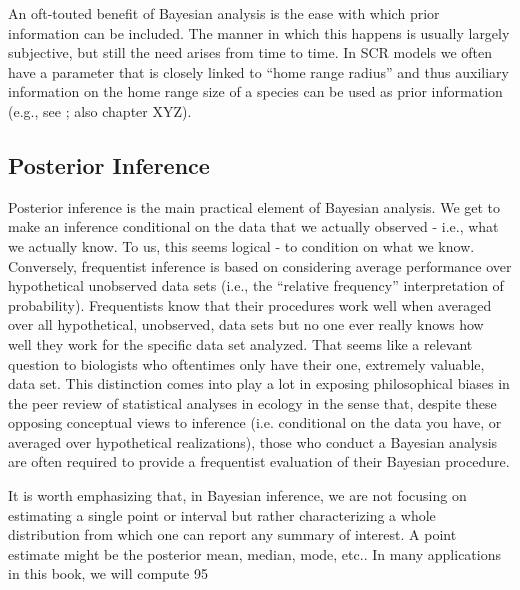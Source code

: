 An oft-touted benefit of Bayesian analysis is the ease with which
prior information can be included. The manner in which this happens is
usually largely subjective, but still the need arises from time to
time. In SCR models we often have a parameter that is closely linked
to ``home range radius'' and thus auxiliary information on the home
range size of a species can be used as prior information (e.g., see
\citet{chandler_royle:2012} ; also chapter XYZ). 



\subsection{Posterior Inference}

Posterior inference is the main practical element  of Bayesian analysis. We get to make an inference conditional on the data that we actually observed - i.e., what we actually know.  To us, this seems logical - to condition on what we know. Conversely, frequentist inference is based on considering average performance over hypothetical unobserved data sets (i.e., the ``relative frequency'' interpretation of probability).  Frequentists know that their procedures work well when averaged over all hypothetical, unobserved, data sets but no one ever really knows how well they work for the specific data set analyzed. That seems like a relevant question to biologists who oftentimes only have their one, extremely valuable, data set.
This distinction comes into play a lot in exposing philosophical biases in the peer review of statistical analyses in ecology in the sense that, despite these opposing conceptual views to inference (i.e. conditional on the data you have, or averaged over hypothetical realizations), those who conduct a Bayesian analysis are often required to provide a frequentist evaluation of their Bayesian procedure.  

  It is worth emphasizing that, in Bayesian inference, we are not focusing on estimating a single point or interval but rather characterizing a whole distribution from which one can report any summary of interest. A point estimate might be the posterior mean, median, mode, etc..  In many applications in this book, we will compute 95%



